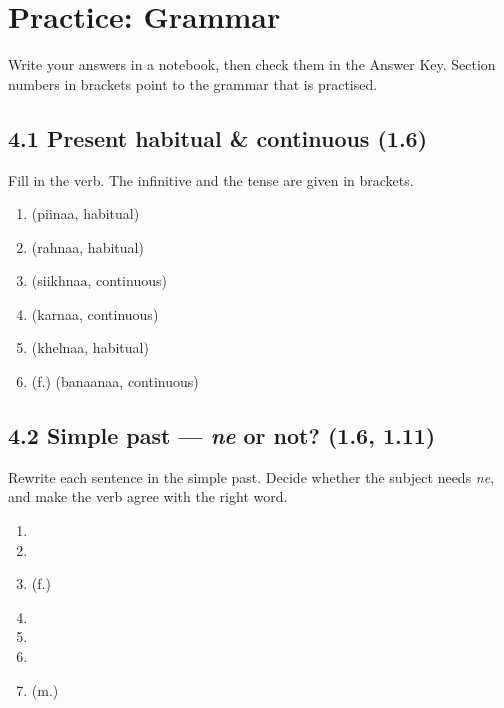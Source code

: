 
\section{Practice: Grammar}

Write your answers in a notebook, then check them in the Answer Key. Section numbers in brackets point to the grammar that is practised.

\subsection{4.1 Present habitual \& continuous (1.6)}

Fill in the verb. The infinitive and the tense are given in brackets.

\begin{enumerate}
  \item {} \hfill (piinaa, habitual)
  \item {} \hfill (rahnaa, habitual)
  \item {} \hfill (siikhnaa, continuous)
  \item {} \hfill (karnaa, continuous)
  \item {} \hfill (khelnaa, habitual)
  \item {} (f.)  \hfill (banaanaa, continuous)
\end{enumerate}

\subsection{4.2 Simple past — \textit{ne} or not? (1.6, 1.11)}

Rewrite each sentence in the simple past. Decide whether the subject needs \textit{ne}, and make the verb agree with the right word.

\begin{enumerate}
  \item {}
  \item {}
  \item {} (f.) 
  \item {}
  \item {}
  \item {}
  \item {} (m.) 
\end{enumerate}

